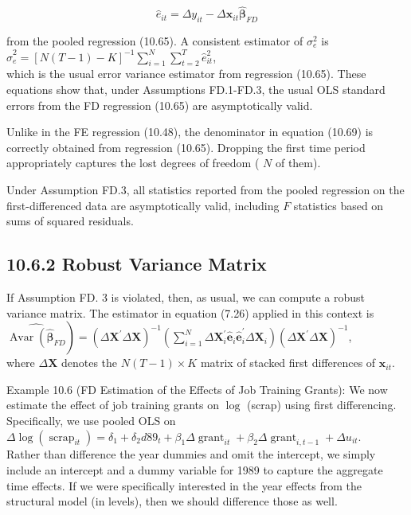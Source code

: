 \documentclass[10pt]{article}
\begin{document}
\begin{equation*}
\hat{e}_{i t}=\Delta y_{i t}-\Delta \mathbf{x}_{i t} \hat{\boldsymbol{\beta}}_{F D} \tag{10.68}
\end{equation*}


from the pooled regression (10.65). A consistent estimator of $\sigma_{e}^{2}$ is\\
$\hat{\sigma}_{e}^{2}=[N(T-1)-K]^{-1} \sum_{i=1}^{N} \sum_{t=2}^{T} \hat{e}_{i t}^{2}$,\\
which is the usual error variance estimator from regression (10.65). These equations show that, under Assumptions FD.1-FD.3, the usual OLS standard errors from the FD regression (10.65) are asymptotically valid.

Unlike in the FE regression (10.48), the denominator in equation (10.69) is correctly obtained from regression (10.65). Dropping the first time period appropriately captures the lost degrees of freedom ( $N$ of them).

Under Assumption FD.3, all statistics reported from the pooled regression on the first-differenced data are asymptotically valid, including $F$ statistics based on sums of squared residuals.

\subsection*{10.6.2 Robust Variance Matrix}
If Assumption FD. 3 is violated, then, as usual, we can compute a robust variance matrix. The estimator in equation (7.26) applied in this context is\\
$\left.\widehat{\operatorname{Avar}\left(\hat{\boldsymbol{\beta}}_{F D}\right.}\right)=\left(\Delta \mathbf{X}^{\prime} \Delta \mathbf{X}\right)^{-1}\left(\sum_{i=1}^{N} \Delta \mathbf{X}_{i}^{\prime} \hat{\mathbf{e}}_{i} \hat{\mathbf{e}}_{i}^{\prime} \Delta \mathbf{X}_{i}\right)\left(\Delta \mathbf{X}^{\prime} \Delta \mathbf{X}\right)^{-1}$,\\
where $\Delta \mathbf{X}$ denotes the $N(T-1) \times K$ matrix of stacked first differences of $\mathbf{x}_{i t}$.

Example 10.6 (FD Estimation of the Effects of Job Training Grants): We now estimate the effect of job training grants on $\log$ (scrap) using first differencing. Specifically, we use pooled OLS on\\
$\Delta \log \left(\operatorname{scrap}_{i t}\right)=\delta_{1}+\delta_{2} d 89_{t}+\beta_{1} \Delta \operatorname{grant}_{i t}+\beta_{2} \Delta \operatorname{grant}_{i, t-1}+\Delta u_{i t}$.\\
Rather than difference the year dummies and omit the intercept, we simply include an intercept and a dummy variable for 1989 to capture the aggregate time effects. If we were specifically interested in the year effects from the structural model (in levels), then we should difference those as well.
\end{document}
